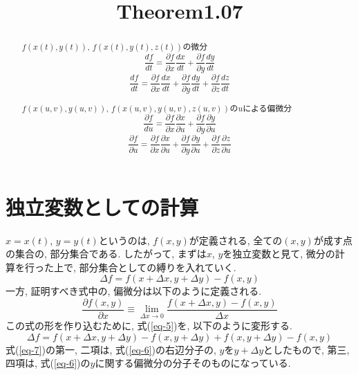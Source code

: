 \documentclass{jsarticle}
\title{Theorem1.07}
\begin{document}
\maketitle

\begin{abstract}
  $f(x(t), y(t))$, $f(x(t), y(t), z(t))$の微分
  \begin{equation}
    \frac{df}{dt} = \frac{\partial f}{\partial x}\frac{dx}{dt} 
    + \frac{\partial f}{\partial y}\frac{dy}{dt}
  \end{equation}
  \begin{equation}
    \frac{df}{dt} = \frac{\partial f}{\partial x}\frac{dx}{dt} 
    + \frac{\partial f}{\partial y}\frac{dy}{dt}
    + \frac{\partial f}{\partial z}\frac{dz}{dt}
  \end{equation}

  $f(x(u, v), y(u, v))$, $f(x(u, v), y(u, v), z(u, v))$の$u$による偏微分
   \begin{equation}
    \frac{\partial f}{du} = \frac{\partial f}{\partial x}\frac{\partial x}{\partial u} 
    + \frac{\partial f}{\partial y}\frac{\partial y}{\partial u}
  \end{equation}
  \begin{equation}
    \frac{\partial f}{\partial u} = \frac{\partial f}{\partial x}\frac{\partial x}{\partial u} 
    + \frac{\partial f}{\partial y}\frac{\partial y}{\partial u}
    + \frac{\partial f}{\partial z}\frac{\partial z}{\partial u}
  \end{equation}
\end{abstract}

\section{独立変数としての計算}\label{sec-1}
$x = x(t)$, $y = y(t)$というのは, $f(x, y)$が定義される, 全ての$(x, y)$が成す点の集合の, 部分集合である. 
したがって, まずは$x$, $y$を独立変数と見て, 微分の計算を行った上で, 部分集合としての縛りを入れていく. 
\begin{equation}\label{eq-5}
  \Delta f = f(x + \Delta x, y + \Delta y) - f(x, y)
\end{equation}
一方, 証明すべき式中の, 偏微分は以下のように定義される. 
\begin{equation}\label{eq-6}
  \frac{\partial f(x, y)}{\partial x} \equiv \lim_{\Delta x \to 0}\frac{f(x + \Delta x, y) - f(x, y)}{\Delta x}
\end{equation}
この式の形を作り込むために, 式(\ref{eq-5})を, 以下のように変形する. 
\begin{equation}\label{eq-7}
  \Delta f = f(x + \Delta x, y + \Delta y) - f(x, y + \Delta y) + f(x, y + \Delta y) - f(x, y)
\end{equation}
式(\ref{eq-7})の第一, 二項は, 式(\ref{eq-6})の右辺分子の, $y$を$y + \Delta y$としたもので, 第三, 四項は, 式(\ref{eq-6})の$y$に関する偏微分の分子そのものになっている. 
\end{document}
